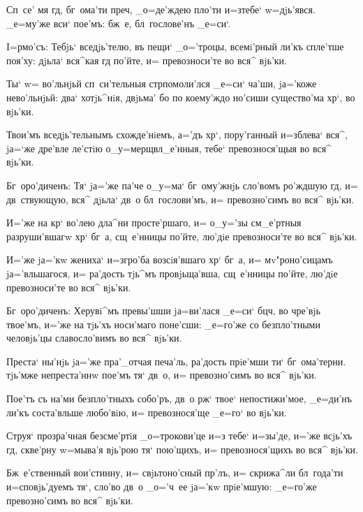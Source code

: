 Сп~се' мя гд, бг~ома'ти преч, _о=де'ждею 
пло'ти и=з\ъ тебе` w=дjь'явся. _е=му'же вси` пое'мъ: 
бж~е, бл~гослове'нъ _е=си`.


I=рмо'съ: Тебjь` вседjь'телю, въ пещи` _о='троцы, 
всемi'рный ли'къ спле'тше поя'ху: дjьла` вся^кая гд 
по'йте, и= превозноси'те во вся^ вjь'ки.

Ты` w= во'льнjьй сп~си'тельныя стр помоли'лся 
_е=си` ча'ши, jа='коже нево'льнjьй: два` хотjь^нiя, 
двjьма' бо по коему'ждо но'сиши существо'ма хр`, во 
вjь'ки.

Твои'мъ вседjь'тельнымъ схожде'нiемъ, а='дъ хр`, 
пору'ганный и=зблева` вся^, jа=`же дре'вле ле'стiю 
о_у=мерщвл_е'нныя, тебе` превознося'щыя во вся^ вjь'ки.

Бг~оро'диченъ: Тя` jа='же па'че о_у=ма` бг~ому'жнjь 
сло'вомъ ро'ждшую гд, и= дв~ствующую, вся^ дjьла` дв~о 
бл~гослови'мъ, и= превозно'симъ во вся^ вjь'ки. 


И='же на кр` во'лею дла^ни просте'ршаго, и= 
о_у='зы см_е'ртныя разруши'вшагw хр` бг~а, сщ~е'нницы 
по'йте, лю'дiе превозноси'те во вся^ вjь'ки. 

И='же jа='кw жениха` и=з\ъ гро'ба возсiя'вшаго хр` 
бг~а, и= мv"роно'сицамъ jа='вльшагося, и= ра'дость тjь^мъ 
провjьща'вша, сщ~е'нницы по'йте, лю'дiе превозноси'те во 
вся^ вjь'ки.

Бг~оро'диченъ: Херувi^мъ превы'шши jа=ви'лася _е=си` 
бц ч, во чре'вjь твое'мъ, и='же на тjь'хъ 
носи'маго поне'сши: _е=го'же со безпло'тными человjь'цы 
славосло'вимъ во вся^ вjь'ки. 


Преста` ны'нjь jа='же пра'_отчая печа'ль, ра'дость 
прiе'мши ти` бг~ома'терни. тjь'мже непреста'ннw пое'мъ 
тя` дв~о, и= превозно'симъ во вся^ вjь'ки.

Пое'тъ съ на'ми безпло'тныхъ собо'ръ, дв~о рж` 
твое` непостижи'мое, _е=ди'нъ ли'къ соста'вльше любо'вiю, 
и= превознося'ще _е=го` во вjь'ки.

Струя` прозра'чная безсме'ртiя _о=трокови'це и=з\ъ 
тебе` и=зы'де, и='же всjь'хъ гд, скве'рну w=мыва'я 
вjь'рою тя` пою'щихъ, и= превознося'щихъ во вся^ вjь'ки.

Бж~е'ственный вои'стинну, и= свjьтоно'сный пр'лъ, 
и= скрижа^ли бл~года'ти и=сповjь'дуемъ тя`, сло'во дв~о 
_о='ч~ее jа='кw прiе'мшую: _е=го'же превозно'симъ во вся^ 
вjь'ки.

